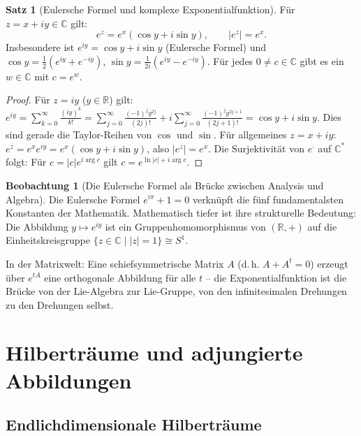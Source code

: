 ﻿\documentclass[a4paper,12pt]{report}
\theoremstyle{definition}
\newtheorem{satz}{Satz}
\newtheorem{beobachtung}{Beobachtung}
\begin{document}
\begin{satz}[Eulersche Formel und komplexe Exponentialfunktion]
    Für $z = x + iy \in \mathbb{C}$ gilt:
    \[
        e^z = e^x (\cos y + i \sin y), \qquad |e^z| = e^x.
    \]
    Insbesondere ist $e^{iy} = \cos y + i \sin y$ (Eulersche Formel) und
    $\cos y = \frac{1}{2}(e^{iy} + e^{-iy})$,
    $\sin y = \frac{1}{2i}(e^{iy} - e^{-iy})$.
    Für jedes $0 \neq c \in \mathbb{C}$ gibt es ein $w \in \mathbb{C}$ mit
    $c = e^w$.
\end{satz}
\begin{proof}
    Für $z = iy$ ($y \in \mathbb{R}$) gilt:
    $e^{iy} = \sum_{k=0}^\infty \frac{(iy)^k}{k!}
    = \sum_{j=0}^\infty \frac{(-1)^j y^{2j}}{(2j)!}
    + i \sum_{j=0}^\infty \frac{(-1)^j y^{2j+1}}{(2j+1)!}
    = \cos y + i \sin y$.
    Dies sind gerade die Taylor-Reihen von $\cos$ und $\sin$.
    Für allgemeines $z = x + iy$: $e^z = e^x e^{iy} = e^x(\cos y + i \sin y)$,
    also $|e^z| = e^x$. Die Surjektivität von $e^{\cdot}$ auf $\mathbb{C}^*$
    folgt: Für $c = |c| e^{i\arg c}$ gilt $c = e^{\ln|c| + i\arg c}$.
\end{proof}


\begin{beobachtung}[Die Eulersche Formel als Brücke zwischen Analysis und Algebra]
    Die Eulersche Formel $e^{i\pi} + 1 = 0$ verknüpft die fünf
    fundamentalsten Konstanten der Mathematik. Mathematisch tiefer
    ist ihre strukturelle Bedeutung: Die Abbildung $y \mapsto e^{iy}$
    ist ein Gruppenhomomorphismus von $(\mathbb{R}, +)$ auf die
    Einheitskreisgruppe $\{z \in \mathbb{C} \mid |z| = 1\} \cong S^1$.

    In der Matrixwelt: Eine schiefsymmetrische Matrix $A$ (d.\,h. $A + A^t = 0$)
    erzeugt über $e^{tA}$ eine orthogonale Abbildung für alle $t$ --
    die Exponentialfunktion ist die Brücke von der Lie-Algebra zur
    Lie-Gruppe, von den infinitesimalen Drehungen zu den Drehungen selbst.
\end{beobachtung}

\chapter{Hilberträume und adjungierte Abbildungen}

\section{Endlichdimensionale Hilberträume}
\end{document}
